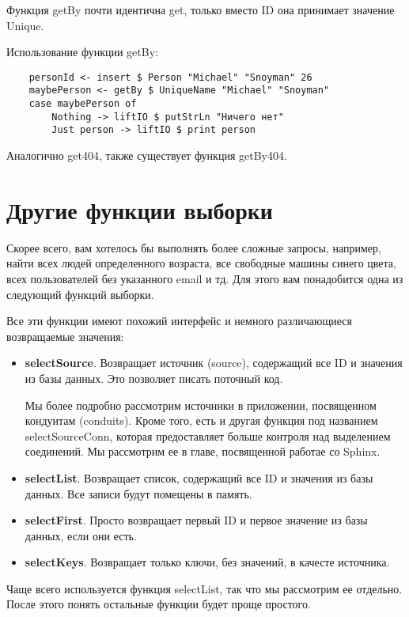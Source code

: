 Функция getBy почти идентична get, только вместо ID она принимает значение Unique.

Использование функции getBy:

\begin{lstlisting}
    personId <- insert $ Person "Michael" "Snoyman" 26
    maybePerson <- getBy $ UniqueName "Michael" "Snoyman"
    case maybePerson of
        Nothing -> liftIO $ putStrLn "Ничего нет"
        Just person -> liftIO $ print person
\end{lstlisting}

Аналогично get404, также существует функция getBy404.

\section{Другие функции выборки} %

Скорее всего, вам хотелось бы выполнять более сложные запросы, например, найти всех людей определенного возраста, все свободные машины синего цвета, всех пользователей без указанного email и тд. Для этого вам понадобится одна из следующий функций выборки.

Все эти функции имеют похожий интерфейс и немного различающиеся возвращаемые значения: 

\begin{itemize}
\item {\bf selectSource}. Возвращает источник (source), содержащий все ID и значения из базы данных. Это позволяет писать поточный код.
\begin{remark}
Мы более подробно рассмотрим источники в приложении, посвященном кондуитам (conduits). Кроме того, есть и другая функция под названием selectSourceConn, которая предоставляет больше контроля над выделением соединений. Мы рассмотрим ее в главе, посвященной работае со Sphinx.
\end{remark}
\item {\bf selectList}. Возвращает список, содержащий все ID и значения из базы данных. Все записи будут помещены в память.
\item {\bf selectFirst}. Просто возвращает первый ID и первое значение из базы данных, если они есть.
\item {\bf selectKeys}. Возвращает только ключи, без значений, в качесте источника.
\end{itemize}

Чаще всего используется функция selectList, так что мы рассмотрим ее отдельно. После этого понять остальные функции будет проще простого.

